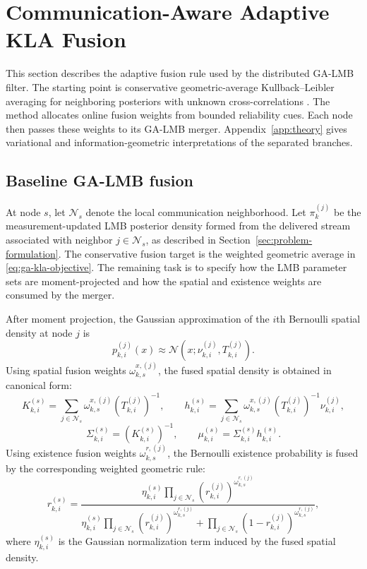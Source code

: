 \section{Communication-Aware Adaptive KLA Fusion}
\label{sec:method}

This section describes the adaptive fusion rule used by the distributed GA-LMB filter. The starting point is conservative geometric-average Kullback--Leibler averaging for neighboring posteriors with unknown cross-correlations \cite{Battistelli2014KLA,Hlinka2014ICI}. The method allocates online fusion weights from bounded reliability cues. Each node then passes these weights to its GA-LMB merger. Appendix~\ref{app:theory} gives variational and information-geometric interpretations of the separated branches.

\subsection{Baseline GA-LMB fusion}

At node $s$, let $\mathcal{N}_s$ denote the local communication neighborhood. Let $\pi_k^{(j)}$ be the measurement-updated LMB posterior density formed from the delivered stream associated with neighbor $j \in \mathcal{N}_s$, as described in Section~\ref{sec:problem-formulation}. The conservative fusion target is the weighted geometric average in \eqref{eq:ga-kla-objective}. The remaining task is to specify how the LMB parameter sets are moment-projected and how the spatial and existence weights are consumed by the merger.

After moment projection, the Gaussian approximation of the $i$th Bernoulli spatial density at node $j$ is
\begin{equation}
p_{k,i}^{(j)}(x) \approx \mathcal{N}\!\left(x;\nu_{k,i}^{(j)}, T_{k,i}^{(j)}\right).
\end{equation}
Using spatial fusion weights $\omega_{k,s}^{x,(j)}$, the fused spatial density is obtained in canonical form:
\begin{equation}
\label{eq:method-gaussian-canonical}
K_{k,i}^{(s)} = \sum_{j \in \mathcal{N}_s} \omega_{k,s}^{x,(j)} \left(T_{k,i}^{(j)}\right)^{-1},
\qquad
h_{k,i}^{(s)} = \sum_{j \in \mathcal{N}_s} \omega_{k,s}^{x,(j)} \left(T_{k,i}^{(j)}\right)^{-1}\nu_{k,i}^{(j)},
\end{equation}
\begin{equation}
\Sigma_{k,i}^{(s)} = \left(K_{k,i}^{(s)}\right)^{-1},
\qquad
\mu_{k,i}^{(s)} = \Sigma_{k,i}^{(s)} h_{k,i}^{(s)}.
\end{equation}
Using existence fusion weights $\omega_{k,s}^{r,(j)}$, the Bernoulli existence probability is fused by the corresponding weighted geometric rule:
\begin{equation}
\label{eq:method-existence-geometric}
r_{k,i}^{(s)} =
\frac{\eta_{k,i}^{(s)} \prod_{j \in \mathcal{N}_s} \left(r_{k,i}^{(j)}\right)^{\omega_{k,s}^{r,(j)}}}
{\eta_{k,i}^{(s)} \prod_{j \in \mathcal{N}_s} \left(r_{k,i}^{(j)}\right)^{\omega_{k,s}^{r,(j)}} +
\prod_{j \in \mathcal{N}_s} \left(1-r_{k,i}^{(j)}\right)^{\omega_{k,s}^{r,(j)}}},
\end{equation}
where $\eta_{k,i}^{(s)}$ is the Gaussian normalization term induced by the fused spatial density.

